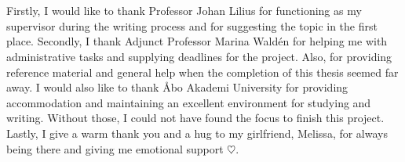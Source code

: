 \bgroup{}

\chapter*{}
Firstly, I would like to thank Professor Johan Lilius for functioning as my supervisor during the writing process and for suggesting the topic in the first place. Secondly, I thank Adjunct Professor Marina Waldén for helping me with administrative tasks and supplying deadlines for the project. Also, for providing reference material and general help when the completion of this thesis seemed far away. I would also like to thank Åbo Akademi University for providing accommodation and maintaining an excellent environment for studying and writing. Without those, I could not have found the focus to finish this project. Lastly, I give a warm thank you and a hug to my girlfriend, Melissa, for always being there and giving me emotional support \ensuremath{\heartsuit}.

\egroup{}